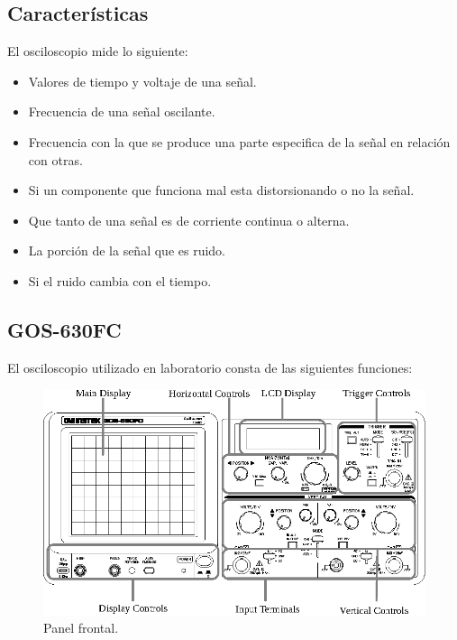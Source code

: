 \documentclass[letter,twoside,11pt]{article}
\begin{document}
\subsection{Características}
El osciloscopio mide lo siguiente:

\begin{itemize}
    \item Valores de tiempo y voltaje de una señal.
    \item Frecuencia de una señal oscilante.
    \item Frecuencia con la que se produce una parte especifica de la señal en
        relación con otras.
    \item Si un componente que funciona mal esta distorsionando o no la señal.
    \item Que tanto de una señal es de corriente continua o alterna.
    \item La porción de la señal que es ruido.
    \item Si el ruido cambia con el tiempo.
\end{itemize}

\subsection{GOS-630FC}
El osciloscopio utilizado en laboratorio consta de las siguientes funciones:

\begin{figure}[!h]
\centering
\includegraphics[scale=1.3]{figura3.eps}
\caption{Panel frontal.}
\end{figure}
\end{document}
